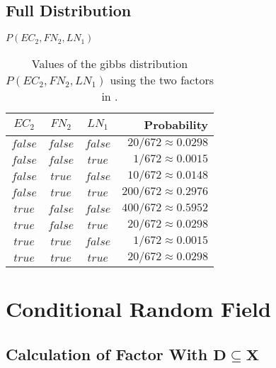 \subsection{Full Distribution}\label{app:subsec-gd-example-distribution}
\begin{table}[h!]
\centering
$P(EC_2,FN_2,LN_1)$\par
\smallskip
\begin{tabular}{c c c r}
 \toprule
 $EC_2$ & $FN_2$ & $LN_1$ & Probability \\
 \midrule
 $false$ & $false$ & $false$ & $20/672\approx0.0298$ \\
 $false$ & $false$ & $true$  & $1/672\approx0.0015$ \\
 $false$ & $true$  & $false$ & $10/672\approx0.0148$ \\
 $false$ & $true$  & $true$  & $200/672\approx0.2976$ \\
 $true$  & $false$ & $false$ & $400/672\approx0.5952$ \\
 $true$  & $false$ & $true$  & $20/672\approx0.0298$ \\
 $true$  & $true$  & $false$ & $1/672\approx0.0015$ \\
 $true$  & $true$  & $true$  & $20/672\approx0.0298$ \\
 \bottomrule
\end{tabular}
\caption{Values of the \Gls{gibbs distribution} $P(EC_2,FN_2,LN_1)$ using the two \glspl{factor} in .}
\label{tab:example-factor-product}
\end{table}
\section{Conditional Random Field}\label{app:sec-gibbs-distribution}
\subsection{Calculation of Factor With $\mathbf{D}\subseteq\mathbf{X}$}\label{app:subsec-gd-example-calculation}

